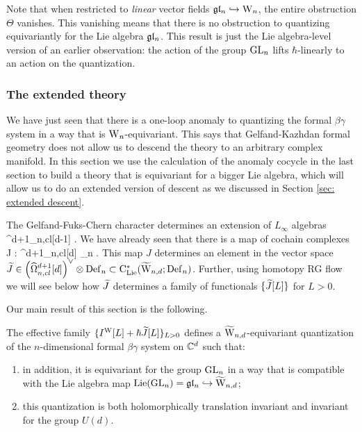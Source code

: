\begin{rmk} 
Note that when restricted to {\em linear} vector fields $\gl_n \hookrightarrow \Vect$, 
the entire obstruction $\Theta$ vanishes. 
This vanishing means that there is no obstruction to quantizing equivariantly for the Lie algebra $\gl_n$. 
This result is just the Lie algebra-level version of an earlier observation: 
the action of the group $\GL_n$ lifts $\hbar$-linearly to an action on the quantization.
\end{rmk}

\subsubsection{The extended theory}

We have just seen that there is a one-loop anomaly to quantizing the formal $\beta\gamma$ system in a way that is $\Vect$-equivariant. 
This says that Gelfand-Kazhdan formal geometry does not allow us to descend the theory to an arbitrary complex manifold. 
In this section we use the calculation of the anomaly cocycle in the last section to build a theory that is equivariant for a bigger Lie algebra, which will allow us to do an extended version of descent as we discussed in Section \ref{sec: extended descent}. 

The Gelfand-Fuks-Chern character determines an extension of $L_\infty$ algebras
 \to \hOmega^{d+1}_{n,cl}[d-1] \to \TVectd {} \Vect {} .
\een
We have already seen that there is a map of cochain complexes
\ben
J : \hOmega^{d+1}_{n,cl}[d] \to \Def_n .
\een
This map $J$ determines an element in the vector space $\Tilde{J} \in \left(\hOmega^{d+1}_{n,cl} [d]\right)^\vee \tensor \Def_n \subset \clie^*(\TVectd ; \Def_n)$.
Further, using homotopy RG flow we will see below how $\Tilde{J}$ determines a family of functionals $\{\Tilde{J}[L]\}$ for $L > 0$.

Our main result of this section is the following. 

\begin{thm}\label{thm: extended quantization}
The effective family $\{I^{\rm W}[L] + \hbar \Tilde{J} [L]\}_{L>0}$ defines a $\TVectd$-equivariant quantization of the $n$-dimensional formal $\beta\gamma$ system on $\CC^d$ such that:
\begin{enumerate}
\item in addition, it is equivariant for the group $\GL_n$ in a way that is compatible with the Lie algebra map ${\rm Lie}(\GL_n) = \gl_n \hookrightarrow \TVectd$;
\item this quantization is both holomorphically translation invariant and invariant for the group $U(d)$.
\end{enumerate}
\end{thm}

